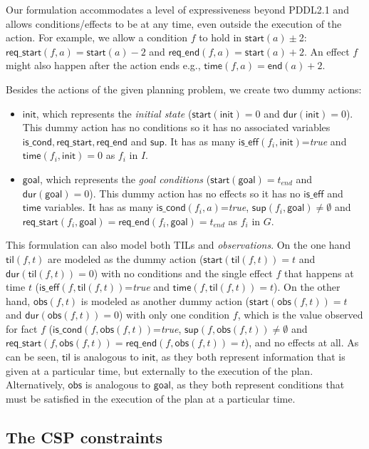 \documentclass{ecai}
\newcommand{\dur}{\mathsf{dur}}    %
\newcommand{\iscond}{\mathsf{is\_cond}}    %
\newcommand{\iseff}{\mathsf{is\_eff}}    %
\newcommand{\obs}{\mathsf{obs}}    %
\newcommand{\start}{\mathsf{start}}%
\newcommand{\en}{\mathsf{end}}     %
\newcommand{\til}{\mathsf{til}}    %
\newcommand{\supp}{\mathsf{sup}}   %
\newcommand{\tim}{\mathsf{time}}   %
\newcommand{\reqs}{\mathsf{req\_{start}}} %
\newcommand{\reqe}{\mathsf{req\_{end}}}   %
\newcommand{\ini}{\mathsf{init}}   %
\newcommand{\goal}{\mathsf{goal}}  %
\begin{document}
Our formulation accommodates a level of expressiveness beyond PDDL2.1 and allows conditions/effects to be at any time, even outside the execution of the action. For example, we allow a condition $f$ to hold in $\start(a)\pm$2: $\reqs(f,a)=\start(a)-2$ and $\reqe(f,a)=\start(a)+2$. An effect $f$ might also happen after the action ends e.g., $\tim(f,a)=\en(a)+2$.


Besides the actions of the given planning problem, we create two dummy actions:

\begin{itemize}
	
\item $\ini$, which represents the {\em initial state} ($\start(\ini)=0$ and $\dur(\ini)=0$). This dummy action has no conditions so it has no associated variables $\iscond, \reqs, \reqe$ and $\supp$. It has as many $\iseff(f_i,\ini)$=\textit{true} and $\tim(f_i,\ini)=0$ as $f_i$ in $I$.

\item $\goal$, which represents the {\em goal conditions} ($\start(\goal)=t_{end}$ and $\dur(\goal)=0$). This dummy action has no effects so it has no $\iseff$ and $\tim$ variables. It has as many $\iscond(f_i,a)$=\textit{true}, $\supp(f_i,\goal)\neq \emptyset$ and $\reqs(f_i,\goal)=\reqe(f_i,\goal)=t_{end}$ as $f_i$ in $G$. 
\end{itemize}  

This formulation can also model both TILs and {\em observations}. On the one hand $\til(f,t)$ are modeled as the dummy action ($\start(\til(f,t))=t$ and $\dur(\til(f,t))=0$) with no conditions and the single effect $f$ that happens at time $t$ ($\iseff(f,\til(f,t))$=\textit{true} and $\tim(f,\til(f,t))=t$). On the other hand, $\obs(f,t)$ is modeled as another dummy action ($\start(\obs(f,t))=t$ and $\dur(\obs(f,t))=0$) with only one condition $f$, which is the value observed for fact $f$ ($\iscond(f,\obs(f,t))$=\textit{true}, $\supp(f,\obs(f,t))\neq \emptyset$ and $\reqs(f,\obs(f,t))=\reqe(f,\obs(f,t))=t$), and no effects at all. 
As can be seen, $\til$ is analogous to $\ini$, as they both represent information that is given at a particular time, but externally to the execution of the plan. Alternatively, $\obs$ is analogous to $\goal$, as they both represent conditions that must be satisfied in the execution of the plan at a particular time.



\subsection{The CSP constraints}
\label{section:CSPconstraints}
\end{document}
